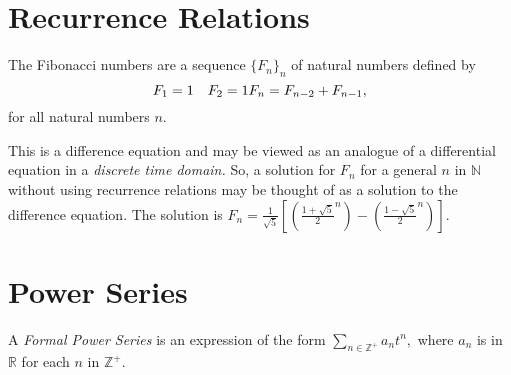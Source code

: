 \section{Recurrence Relations}
\begin{example}
	The Fibonacci numbers are a sequence $\{ F_n \}_n$ of natural numbers defined by
	$$ F_1 = 1 \quad F_2 = 1 \\
	F_n = F_{n-2} + F_{n-1},$$
	for all natural numbers $n.$
\end{example}
This is a difference equation and may be viewed as an analogue of a differential
equation in a \emph{discrete time domain.}
So, a solution for $F_n$ for a general $n$ in $\mathbb{N}$ without
using recurrence relations may be thought of as a solution to the difference equation.
The solution is $F_n = \frac{1}{\sqrt{5}} \left[ \left( 
\frac{1 + \sqrt{5}}{2}^n \right)  - \left( \frac{1 - \sqrt{5}}{2}^n \right) \right].$

\section{Power Series}
A \emph{Formal Power Series} is an expression of the form $ \sum_{n \in \mathbb{Z}^+}^{} 
a_n t^n,$ where $a_n$ is in $\mathbb{R}$ for each $n$ in $\mathbb{Z}^+.$
